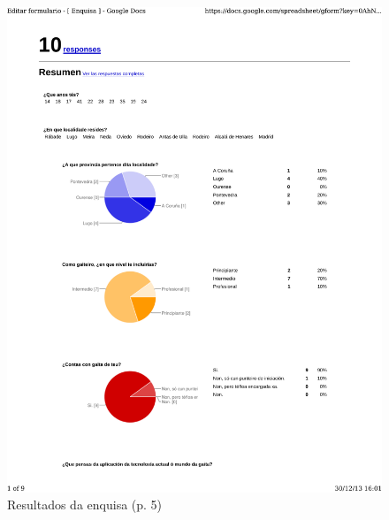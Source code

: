 \begin{figure}
 \centering
 \includegraphics[scale=0.7,page=5,keepaspectratio=true]{./imagenes/enquisa.pdf}
 \caption{Resultados da enquisa (p. 5)}
 \label{figura:ResultadosEnquisa5}
\end{figure}

